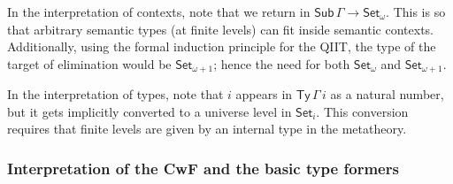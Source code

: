 \documentclass[acmsmall,screen,review]{acmart}
\newcommand{\msf}[1]{{\mathsf{#1}}}
\newcommand{\Set}{\msf{Set}}
\newcommand{\Sub}{\msf{Sub}}
\newcommand{\Ty}{\msf{Ty}}
\begin{document}
In the interpretation of contexts, note that we return in $\Sub\,\Gamma \to \Set_\omega$. This is so
that arbitrary semantic types (at finite levels) can fit inside semantic contexts. Additionally,
using the formal induction principle for the QIIT, the type of the target of elimination would be
$\Set_{\omega+1}$; hence the need for both $\Set_\omega$ and $\Set_{\omega+1}$.


In the interpretation of types, note that $i$ appears in $\Ty\,\Gamma\,i$ as a natural number,
but it gets implicitly converted to a universe level in $\Set_i$. This conversion requires that
finite levels are given by an internal type in the metatheory.

\subsubsection{Interpretation of the CwF and the basic type formers}
\end{document}
